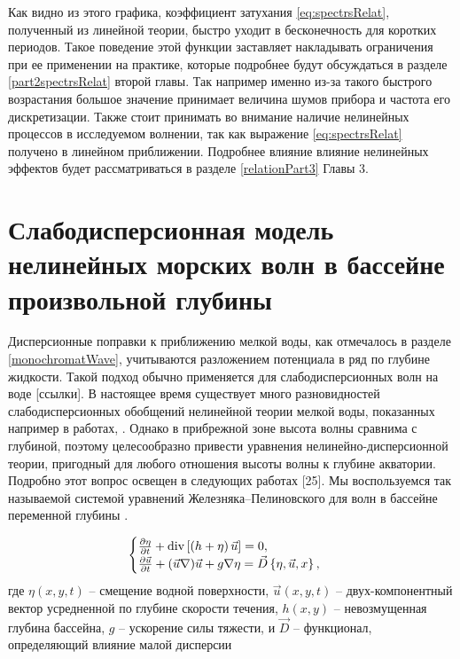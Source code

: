 Как видно из этого графика, коэффициент затухания \eqref{eq:spectrsRelat}, полученный из линейной теории, быстро уходит в бесконечность для коротких периодов. Такое поведение этой функции заставляет накладывать ограничения при ее применении на практике, которые подробнее будут обсуждаться в разделе \ref{part2spectrsRelat} второй главы. Так например именно из-за такого быстрого возрастания большое значение принимает величина шумов прибора и частота его дискретизации. Также стоит принимать во внимание наличие нелинейных процессов в исследуемом волнении, так как выражение \eqref{eq:spectrsRelat} получено в линейном приближении. Подробнее влияние влияние нелинейных эффектов  будет рассматриваться в разделе \ref{relationPart3} Главы 3.



\section{Слабодисперсионная модель нелинейных морских волн в бассейне произвольной глубины }
Дисперсионные поправки к приближению мелкой воды, как отмечалось в разделе \ref{monochromatWave}, учитываются разложением потенциала в ряд по глубине жидкости. Такой подход обычно применяется для слабодисперсионных волн на воде \textcolor[rgb]{1.00,0.00,0.00}{[ссылки]}. В настоящее время существует много разновидностей слабодисперсионных обобщений нелинейной теории мелкой воды, показанных например в работах, \cite{Green_1976}\cite{Zhel_1985} \cite{Fedotova_2008} \cite{Fedotova_2012}.  Однако в прибрежной зоне высота волны сравнима с глубиной, поэтому целесообразно привести уравнения нелинейно-дисперсионной теории, пригодный для любого отношения высоты волны к глубине акватории. Подробно этот вопрос освещен в следующих работах \textcolor[rgb]{1.00,0.00,0.00}{[25]}. Мы воспользуемся так называемой системой уравнений Железняка--Пелиновского для волн в бассейне переменной глубины \cite{Zhel_Pel_1985}.

\begin{equation} \label{eq:zhelPel}
\begin{cases}
\frac{\partial \eta }{\partial t} +{\rm div}\left[\left(h+\eta \right)\vec{u}\right]=0, \\
\frac{\partial \vec{u}}{\partial t} +(\vec{u}\nabla )\vec{u}+g\nabla \eta =\vec{D}\left\{\eta ,\vec{u},x\right\},
\end{cases}
\end{equation}
где $\eta(x,y,t)$ -- смещение водной поверхности, $\vec{u}(x,y,t)$ -- двух-компонентный вектор усредненной по глубине скорости течения, $h(x,y)$ -- невозмущенная глубина бассейна, $g$ -- ускорение силы тяжести, и $\vec{D}$ -- функционал, определяющий влияние малой дисперсии


